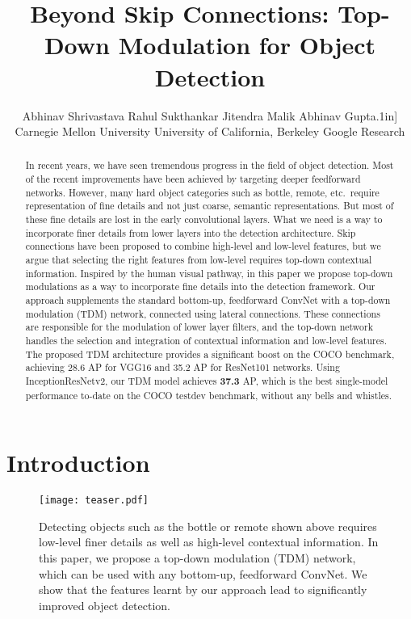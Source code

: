 \documentclass[10pt,twocolumn,letterpaper]{article}
\begin{document}
\title{Beyond Skip Connections: Top-Down Modulation for Object Detection}

\author{}
\author{Abhinav Shrivastava \quad\quad Rahul Sukthankar \quad\quad Jitendra Malik \quad\quad Abhinav Gupta\0.1in]
Carnegie Mellon University \quad
University of California, Berkeley \quad
Google Research
\\}


\maketitle
\begin{abstract}
In recent years, we have seen tremendous progress in the field of object detection. Most of the recent improvements have been achieved by targeting deeper feedforward networks. However, many hard object categories such as bottle, remote, etc.\ require representation of fine details and not just coarse, semantic representations. But most of these fine details are lost in the early convolutional layers. What we need is a way to incorporate finer details from lower layers into the detection architecture. Skip connections have been proposed to combine high-level and low-level features, but we argue that selecting the right features from low-level requires top-down contextual information. Inspired by the human visual pathway, in this paper we propose top-down modulations as a way to incorporate fine details into the detection framework. Our approach supplements the standard bottom-up, feedforward ConvNet with a top-down modulation (TDM) network, connected using lateral connections. 
These connections are responsible for the modulation of lower layer filters, and the top-down network handles the selection and integration of contextual information and low-level features. The proposed TDM architecture provides a significant boost on the COCO benchmark, achieving 28.6 AP for VGG16 and 35.2 AP for ResNet101 networks. 
Using InceptionResNetv2, our TDM model achieves \textbf{37.3} AP, which is the best single-model performance to-date on the COCO testdev benchmark, without any bells and whistles.
\vspace{-0.1in}
\end{abstract}

\section{Introduction}\label{sec:intro}
\begin{figure}
    \centering
    \texttt{[image: teaser.pdf]}
    \caption{Detecting objects such as the bottle or remote shown above requires low-level finer details as well as high-level contextual information. In this paper, we propose a top-down modulation (TDM) network, which can be used with any bottom-up, feedforward ConvNet. We show that the features learnt by our approach lead to significantly improved object detection.}
    \label{fig:bottleRemote}
    \vspace{-0.2in}
\end{figure}
\end{document}
